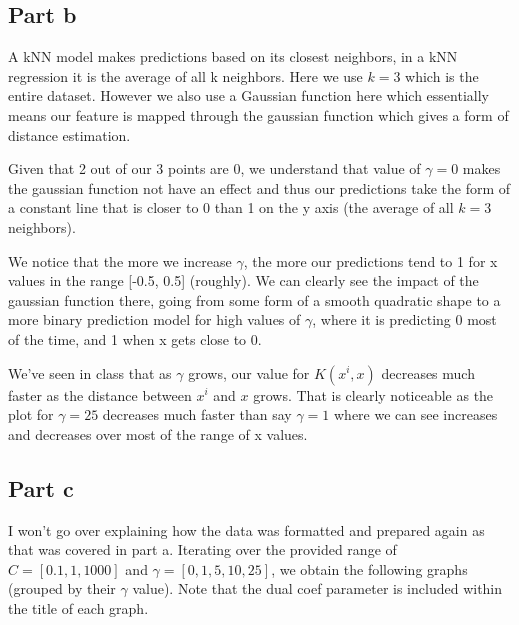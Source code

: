 \documentclass[10pt]{article}
\begin{document}
\begin{figure}[H]
\end{figure}

\subsection*{Part b}
A kNN model makes predictions based on its closest neighbors, in a kNN regression it is the average of all
k neighbors. Here we use $ k = 3$ which is the entire dataset. However we also use a Gaussian function here which essentially means
our feature is mapped through the gaussian function which gives a form of distance estimation.

Given that 2 out of our 3 points are 0, we understand that value of $ \gamma = 0$ makes the gaussian function
not have an effect and thus our predictions take the form of a constant line that is closer to 0 than 1 on the y axis (the average of all
$k = 3$ neighbors).

We notice that the more we increase $\gamma$, the more our predictions tend to 1 for x values in the range [-0.5, 0.5] (roughly). We can clearly
see the impact of the gaussian function there, going from some form of a smooth quadratic shape to a more binary prediction model for high
values of $\gamma$, where it is predicting 0 most of the time, and 1 when x gets close to 0.

We've seen in class that as $\gamma$ grows, our value for $K(x^{i}, x)$ decreases much faster as the distance between $x^{i}$ and $x$ grows.
That is clearly noticeable as the plot for $\gamma = 25$ decreases much faster than say $\gamma = 1$ where we can see increases and decreases over
most of the range of x values.


\subsection*{Part c}
I won't go over explaining how the data was formatted and prepared again as that was covered in part a. Iterating over the provided range
of $ C = [0.1, 1, 1000] $ and $ \gamma = [0, 1, 5, 10, 25]$, we obtain the following graphs (grouped by their $\gamma$ value).
Note that the dual coef parameter is included within the title of each graph.
\end{document}
